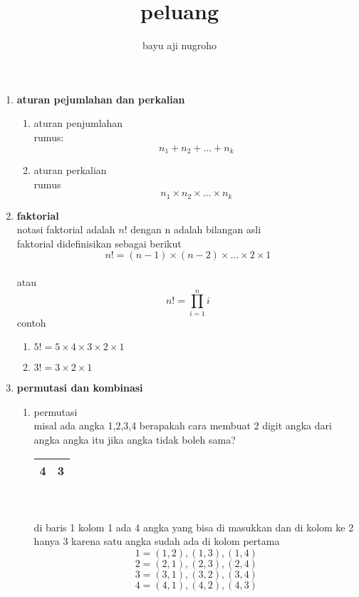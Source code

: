 \documentclass[11pt]{article}
\title{peluang}
\author{bayu aji nugroho}
\begin{document}
\maketitle
\begin{enumerate}
    \item \textbf{aturan pejumlahan dan perkalian}
    \begin{enumerate}
        \item aturan penjumlahan\\
        rumus: $$ n_1 + n_2 + \dots + n_k $$ 
        \item aturan perkalian\\
        rumus $$ n_1 \times n_2 \times \dots \times n_k $$
    \end{enumerate}
    \item \textbf{faktorial}
    \\ notasi faktorial adalah $n!$ dengan n adalah bilangan asli \\ faktorial didefinisikan sebagai berikut
    $$ n! = (n-1)\times (n-2) \times \dots \times 2 \times 1$$ \\ atau
    $$ n! = \prod_{i=1}^{n} i$$
    contoh
    \begin{enumerate}
        \item $5! = 5\times 4 \times 3 \times 2 \times 1$
        \item $3! = 3\times 2\times 1$
    \end{enumerate}
    \newpage
    \item \textbf{permutasi dan kombinasi}
    \begin{enumerate}
        \item permutasi\\
        misal ada angka 1,2,3,4 berapakah cara membuat 2 digit angka dari  angka angka itu jika angka tidak boleh sama?\\
        
        \begin{tabular}{|c|c|}
            \hline
            4&3  \\
            \hline
            \end{tabular}
            \\ \\
        di baris 1 kolom 1 ada 4 angka yang bisa di masukkan dan di kolom ke 2
        hanya 3 karena satu angka sudah ada di kolom pertama 
        $$1 = {(1,2),(1,3),(1,4)}$$
        $$2 = {(2,1),(2,3),(2,4)}$$
        $$3 = {(3,1),(3,2),(3,4)}$$
        $$4 = {(4,1),(4,2),(4,3)}$$


\end{enumerate}
\end{enumerate}
\end{document}
